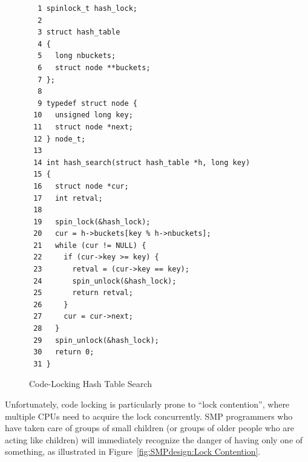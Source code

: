 \begin{figure}[htbp]
{ \scriptsize
\begin{verbatim}
  1 spinlock_t hash_lock;
  2
  3 struct hash_table
  4 {
  5   long nbuckets;
  6   struct node **buckets;
  7 };
  8
  9 typedef struct node {
 10   unsigned long key;
 11   struct node *next;
 12 } node_t;
 13
 14 int hash_search(struct hash_table *h, long key)
 15 {
 16   struct node *cur;
 17   int retval;
 18
 19   spin_lock(&hash_lock);
 20   cur = h->buckets[key % h->nbuckets];
 21   while (cur != NULL) {
 22     if (cur->key >= key) {
 23       retval = (cur->key == key);
 24       spin_unlock(&hash_lock);
 25       return retval;
 26     }
 27     cur = cur->next;
 28   }
 29   spin_unlock(&hash_lock);
 30   return 0;
 31 }
\end{verbatim}
}
\caption{Code-Locking Hash Table Search}
\label{fig:SMPdesign:Code-Locking Hash Table Search}
\end{figure}

Unfortunately, code locking is particularly prone to ``lock contention'',
where multiple CPUs need to acquire the lock concurrently.
SMP programmers who have taken care of groups of small children
(or groups of older people who are acting like children) will immediately
recognize the danger of having only one of something,
as illustrated in Figure~\ref{fig:SMPdesign:Lock Contention}.



